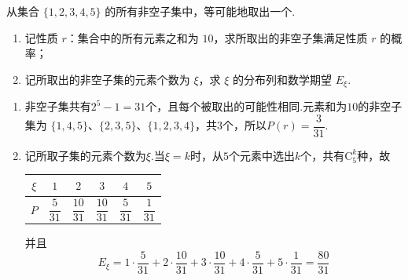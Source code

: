 \begin{problem}
从集合 \(\{1, 2, 3, 4, 5\}\) 的所有非空子集中，等可能地取出一个.

\begin{enumerate}
\item 记性质 \(r\)：集合中的所有元素之和为 \(10\)，求所取出的非空子集满足性质 \(r\) 的概率；
\item 记所取出的非空子集的元素个数为 \(\xi\)，求 \(\xi\) 的分布列和数学期望 \(E_{\xi}\).
\end{enumerate}

\begin{solution}
\begin{enumerate}
\item 非空子集共有\(2^5-1=31\)个，且每个被取出的可能性相同.元素和为\(10\)的非空子集为
\(\{1,4,5\}\)、\(\{2,3,5\}\)、\(\{1,2,3,4\}\)，共\(3\)个，所以\(P(r)=\dfrac{3}{31}\).

\item 记所取子集的元素个数为\(\xi\).当\(\xi=k\)时，从\(5\)个元素中选出\(k\)个，共有\(\mathrm C_5^k\)种，故
\begin{center}
\begin{tabular}{c|ccccc}
\(\xi\)&\(1\)&\(2\)&\(3\)&\(4\)&\(5\)\\
\hline
\(P\)&\(\dfrac{5}{31}\)&\(\dfrac{10}{31}\)&\(\dfrac{10}{31}\)&\(\dfrac{5}{31}\)&\(\dfrac{1}{31}\)
\end{tabular}
\end{center}
并且
\[
E_{\xi}=1\cdot\frac{5}{31}+2\cdot\frac{10}{31}+3\cdot\frac{10}{31}+4\cdot\frac{5}{31}+5\cdot\frac{1}{31}
=\frac{80}{31}
\]
\end{enumerate}
\end{solution}
\end{problem}

